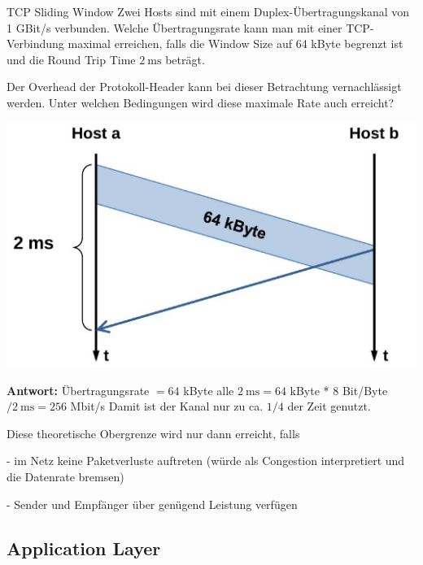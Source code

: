 \begin{example2}{TCP Sliding Window}
Zwei Hosts sind mit einem Duplex-Übertragungskanal von 1 GBit/s verbunden. Welche Übertragungsrate kann man mit einer TCP-Verbindung maximal erreichen, falls die Window Size auf 64 kByte begrenzt ist und die Round Trip Time $2 \mathrm{~ms}$ beträgt.

Der Overhead der Protokoll-Header kann bei dieser Betrachtung vernachlässigt werden. Unter welchen Bedingungen wird diese maximale Rate auch erreicht?

\begin{minipage}{0.4\linewidth}
  \includegraphics[width=1\linewidth]{images/tcp_slidingwindow.png}
\end{minipage}
\begin{minipage}{0.6\linewidth}
  \textbf{Antwort:}
Übertragungsrate $=64$ kByte alle $2 \mathrm{~ms}=64$ kByte * 8 Bit/Byte $/ 2 \mathrm{~ms}=256$ Mbit/s Damit ist der Kanal nur zu ca. $1 / 4$ der Zeit genutzt.
\end{minipage}

Diese theoretische Obergrenze wird nur dann erreicht, falls

- im Netz keine Paketverluste auftreten (würde als Congestion interpretiert und die Datenrate bremsen)

- Sender und Empfänger über genügend Leistung verfügen
  
\end{example2}

\subsection*{Application Layer}

